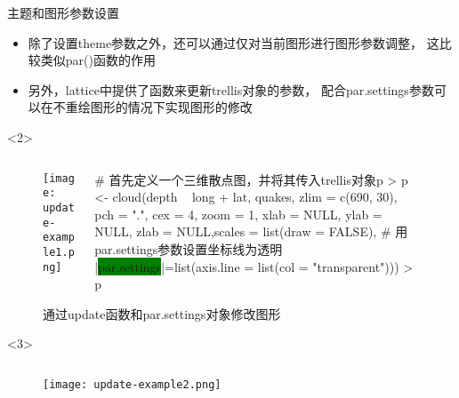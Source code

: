 \begin{frame}[t,fragile]{\subsecname}{主题和图形参数设置}
\begin{itemize}
\item 除了设置theme参数之外，还可以通过仅对当前图形进行图形参数调整，
这比较类似par()函数的作用
\item 另外，lattice中提供了函数来更新trellis对象的参数，
配合par.settings参数可以在不重绘图形的情况下实现图形的修改
\end{itemize}

\begin{overlayarea}{\textwidth}{\textheight}
\begin{onlyenv}<2>
\begin{figure}
 \begin{columns}
    \begin{column}[c]{.4\textwidth}
        \texttt{[image: update-example1.png]}
    \end{column}

    \begin{column}[c]{.6\textwidth}
\begin{rcode}
# 首先定义一个三维散点图，并将其传入trellis对象p
> p <-
  cloud(depth ~ long + lat, quakes, zlim = c(690, 30), pch = ".", cex = 4, zoom = 1, xlab = NULL, ylab = NULL, zlab = NULL,scales = list(draw = FALSE),
        # 用par.settings参数设置坐标线为透明
        |\colorbox{green}{par.settings}|=list(axis.line = list(col = "transparent")))
> p
\end{rcode}
    \end{column}
  \end{columns}
  \caption{通过update函数和par.settings对象修改图形}
\end{figure}
\end{onlyenv}

\vspace{-10pt}
\begin{onlyenv}<3>
\begin{figure}
 \begin{columns}
    \begin{column}[c]{.4\textwidth}
        \texttt{[image: update-example2.png]}
    \end{column}


\end{columns}
\end{figure}
\end{onlyenv}
\end{overlayarea}
\end{frame}
